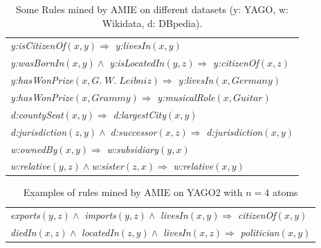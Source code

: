 \begin{table}[t]
\begin{tabular}{|l|}
\hline
\emph{y:isCitizenOf}$(x,y) \Rightarrow$ \emph{y:livesIn}$(x,y)$\\
\emph{y:wasBornIn}$(x,y) \wedge$ \emph{y:isLocatedIn}$(y,z) \Rightarrow$ \emph{y:citizenOf}$(x,z)$\\
\emph{y:hasWonPrize}$(x,G.\;W.\;Leibniz) \Rightarrow$ \emph{y:livesIn}$(x,Germany)$\\
\emph{y:hasWonPrize}$(x,Grammy) \Rightarrow$ \emph{y:musicalRole}$(x,Guitar)$\\
\emph{d:countySeat}$(x,y) \Rightarrow$ \emph{d:largestCity}$(x,y)$\\
\emph{d:jurisdiction}$(z,y) \wedge\; $\emph{d:successor}$(x,z) \Rightarrow$ \emph{d:jurisdiction}$(x,y)$\\
\emph{w:ownedBy}$(x,y) \Rightarrow$ \emph{w:subsidiary}$(y, x)$\\
\emph{w:relative}$(y,z) \wedge $\emph{w:sister}$(z, x)  \Rightarrow$ \emph{w:relative}$(x,y)$\\
\hline
\end{tabular}
\caption{Some Rules mined by AMIE on different datasets (y: YAGO, w: Wikidata, d: DBpedia).}\label{rules}
\end{table}

\begin{table}
\hspace*{-2.4ex}
\begin{tabular}{|l|}
\hline
\emph{exports}$(y,z) \wedge$ \emph{imports}$(y,z) \wedge$ \emph{livesIn}$(x,y) \Rightarrow $ \emph{citizenOf}$(x,y)$\\
\emph{diedIn}$(x,z) \wedge$ \emph{locatedIn}$(z,y) \wedge$ \emph{livesIn}$(x,z) \Rightarrow $ \emph{politician}$(x,y)$\\
\hline
\end{tabular}
\caption{Examples of rules mined by AMIE on YAGO2 with $n=4$ atoms}\label{rules4atoms}
\end{table}

